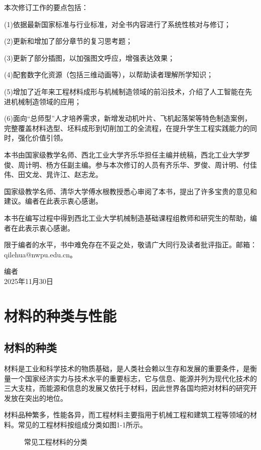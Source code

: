 \documentclass[UTF8]{ctexbook}
\newcommand{\◎}{\ensuremath{\bigcirc}}
\begin{document}
本次修订工作的要点包括：

(1)依据最新国家标准与行业标准，对全书内容进行了系统性核对与修订；

(2)更新和增加了部分章节的复习思考题；

(3)更新了部分插图，以加强图文呼应，增强表达效果；

(4)配套数字化资源（包括三维动画等），以帮助读者理解所学知识；

(5)增加了近年来工程材料成形与机械制造领域的前沿技术，介绍了人工智能在先进机械制造领域的应用；

(6)面向“总师型”人才培养需求，新增发动机叶片、飞机起落架等特色制造案例，完整覆盖材料选型、坯料成形到切削加工的全流程，在提升学生工程实践能力的同时，强化价值引领。


本书由国家级教学名师、西北工业大学齐乐华担任主编并统稿，西北工业大学罗俊、周计明、杨方任副主编。参与本次修订的人员有齐乐华、罗俊、周计明、付佳伟、田文龙、晁许江、赵志龙。

国家级教学名师、清华大学傅水根教授悉心审阅了本书，提出了许多宝贵的意见和建议。编者在此表示衷心感谢。

本书在编写过程中得到西北工业大学机械制造基础课程组教师和研究生的帮助，编者在此表示衷心感谢。

限于编者的水平，书中难免存在不妥之处，敬请广大同行及读者批评指正。邮箱：qilehua@nwpu.edu.cn。

\begin{flushright}
编者 \\
2025年11月30日
\end{flushright}

\tableofcontents

\chapter{材料的种类与性能}

\section{材料的种类}

材料是工业和科学技术的物质基础，是人类社会赖以生存和发展的重要条件，是衡量一个国家经济实力与技术水平的重要标志，它与信息、能源并列为现代化技术的三大支柱，而能源和信息的发展又依托于材料，因此世界各国均把对材料的研究开发放在突出的地位。

材料品种繁多，性能各异，而工程材料主要指用于机械工程和建筑工程等领域的材料。常见的工程材料按组成分类如图1-1所示。

\begin{figure}[H]
    \centering
    \caption{常见工程材料的分类}
\end{figure}
\end{document}
